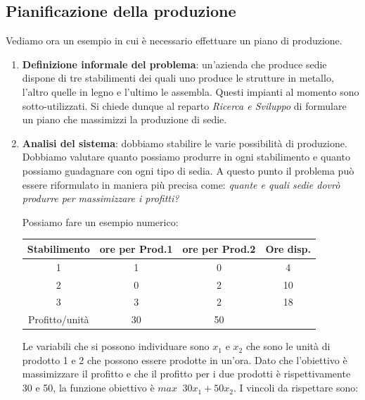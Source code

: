 \documentclass[11pt]{book}
\begin{document}
\subsection{Pianificazione della produzione}

Vediamo ora un esempio in cui \`e necessario effettuare un piano di
produzione.


\begin{enumerate}

\item {\bf Definizione informale del problema}: un'azienda che produce
  sedie dispone di tre stabilimenti dei quali uno produce le strutture
  in metallo, l'altro quelle in legno e l'ultimo le assembla. Questi
  impianti al momento sono sotto-utilizzati. Si chiede dunque al
  reparto {\em Ricerca e Sviluppo} di formulare un piano che
  massimizzi la produzione di sedie.

\item {\bf Analisi del sistema}: dobbiamo stabilire le varie
  possibilit\`a di produzione. Dobbiamo valutare quanto possiamo
  produrre in ogni stabilimento e quanto possiamo guadagnare con ogni
  tipo di sedia. A questo punto il problema pu\`o essere riformulato
  in maniera pi\`u precisa come: {\em quante e quali sedie dovr\`o
    produrre per massimizzare i profitti?}

  Possiamo fare un esempio numerico:\\
 
  \vspace{10 mm}
  \scriptsize
  \begin{tabular}{|c|c c|c|}
    \hline
    {\bf Stabilimento} & {\bf ore per Prod.1} & {\bf
      ore per Prod.2} & {\bf
      Ore disp.} \\\hline

    1 & 1 & 0 & 4 \\
    2 & 0 & 2 & 10 \\
    3 & 3 & 2 & 18 \\ \hline
    Profitto/unit\`a & 30 & 50 &  \\\hline

  \end{tabular}
  \normalsize
  \vspace{10 mm}

  Le variabili che si possono individuare sono $x_1$ e $x_2$ che sono
  le unit\`a di prodotto 1 e 2 che possono essere prodotte in
  un'ora. Dato che l'obiettivo \`e massimizzare il profitto e che il
  profitto per i due prodotti \`e rispettivamente 30 e 50, la funzione
  obiettivo \`e $max\phantom{a}30x_1 + 50x_2$. I vincoli da rispettare
  sono:


\end{enumerate}
\end{document}
